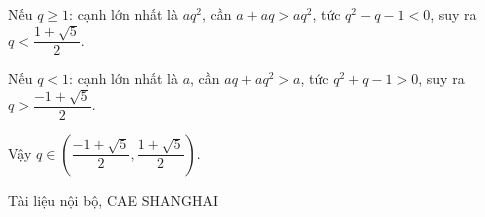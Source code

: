 \documentclass[11pt, a4paper]{article}
\begin{document}
Nếu $q \ge 1$: cạnh lớn nhất là $aq^2$, cần $a + aq > aq^2$, tức $q^2 - q - 1 < 0$, suy ra $q < \dfrac{1 + \sqrt{5}}{2}$.

Nếu $q < 1$: cạnh lớn nhất là $a$, cần $aq + aq^2 > a$, tức $q^2 + q - 1 > 0$, suy ra $q > \dfrac{-1 + \sqrt{5}}{2}$.

Vậy $q \in \left(\dfrac{-1 + \sqrt{5}}{2}, \dfrac{1 + \sqrt{5}}{2}\right)$.
\vspace{0.8cm}
\begin{center}
{\footnotesize\color{cae_blue} Tài liệu nội bộ, CAE SHANGHAI}
\end{center}
\end{document}
